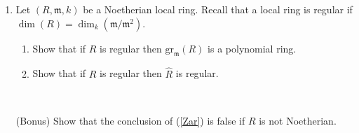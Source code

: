 \documentclass{amsart}[12pt]
\numberwithin{equation}{section}
\theoremstyle{plain} %
\theoremstyle{definition}
\theoremstyle{remark}
\begin{document}
\begin{enumerate}
\

\item Let $(R,\mathfrak{m},k)$ be a Noetherian local ring. Recall that a local ring is regular if $\dim(R) = \dim_k(\mathfrak{m}/\mathfrak{m}^2)$.
\begin{enumerate}
\item Show that if $R$ is regular then $\mathrm{gr}_{\mathfrak{m}}(R)$ is a polynomial ring.
\item Show that if $R$ is regular then $\widehat{R}$ is regular.
\end{enumerate}

\


\item[(Bonus)] Show that the conclusion of (\ref{Zar}) is false if $R$ is not Noetherian.


\end{enumerate}
\end{document}

